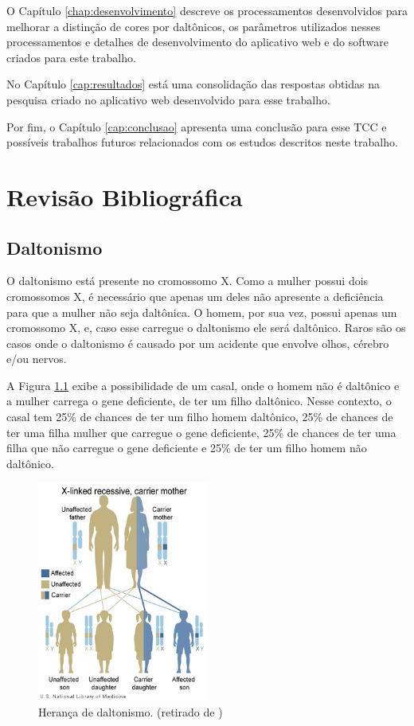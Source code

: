 \documentclass[	12pt, Times, openright, twoside, a4paper, english, brazil]{abntex2}
\begin{document}
O Capítulo \ref{chap:desenvolvimento} descreve os processamentos desenvolvidos para melhorar a distinção de cores por daltônicos, os parâmetros utilizados nesses processamentos e detalhes de desenvolvimento do aplicativo web e do software criados para este trabalho. 

No Capítulo \ref{cap:resultados} está uma consolidação das respostas obtidas na pesquisa criado no aplicativo web desenvolvido para esse trabalho. 

Por fim, o Capítulo \ref{cap:conclusao} apresenta uma conclusão para esse TCC e possíveis trabalhos futuros relacionados com os estudos descritos neste trabalho.

\chapter{Revisão Bibliográfica}
\label{chap:revisao}
\section{Daltonismo}

O daltonismo está presente no cromossomo X. Como a mulher possui dois cromossomos X, é necessário que apenas um deles não apresente a deficiência para que a mulher não seja daltônica. O homem, por sua vez, possui apenas um cromossomo X, e, caso esse carregue o daltonismo ele será daltônico. Raros são os casos onde o daltonismo é causado por um acidente que envolve olhos, cérebro e/ou nervos.

A Figura \ref{fig:figuraHerancaDaltonismo} exibe a possibilidade de um casal, onde o homem não é daltônico e a mulher carrega o gene deficiente, de ter um filho daltônico. Nesse contexto, o casal tem 25\% de chances de ter um filho homem daltônico, 25\% de chances de ter uma filha mulher que carregue o gene deficiente, 25\% de chances de ter uma filha que não carregue o gene deficiente e 25\% de ter um filho homem não daltônico.

\begin{figure}[!htb]
\centering
\includegraphics[width=0.5\textwidth]{figuraHerancaDaltonismo.jpg}
\caption{Herança de daltonismo. (retirado de ) \label{fig:figuraHerancaDaltonismo}}
\end{figure}
\end{document}
